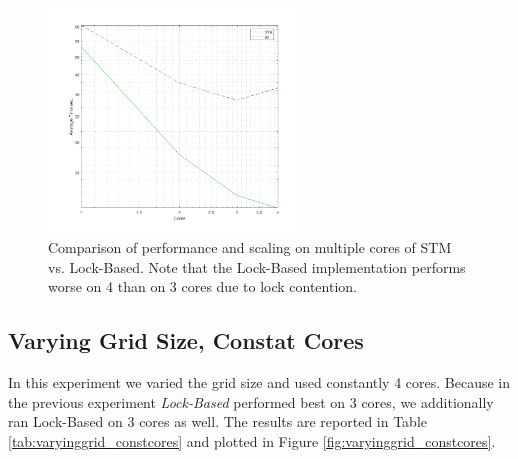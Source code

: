 
\begin{figure}
	\centering
	\includegraphics[width=0.6\textwidth, angle=0]{./fig/sir/core_duration_stm_io.png}
	\caption{Comparison of performance and scaling on multiple cores of STM vs. Lock-Based. Note that the Lock-Based implementation performs worse on 4 than on 3 cores due to lock contention.}
	\label{fig:core_duration_stm_io}
\end{figure}

\subsection{Varying Grid Size, Constat Cores}
In this experiment we varied the grid size and used constantly 4 cores. Because in the previous experiment \textit{Lock-Based} performed best on 3 cores, we additionally ran Lock-Based on 3 cores as well. %
The results are reported in Table \ref{tab:varyinggrid_constcores} and plotted in Figure \ref{fig:varyinggrid_constcores}.

